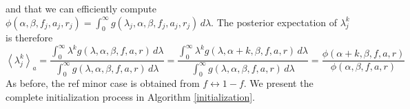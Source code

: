 \documentclass[nofootinbib,amssymb,amsmath]{revtex4}
\newcommand{\ave}[1]{\left\langle #1 \right\rangle}
\begin{document}
%
and that we can efficiently compute $\phi(\alpha, \beta, f_j, a_j, r_j) = \int_0^\infty g(\lambda_j, \alpha, \beta, f_j, a_j, r_j) \, d \lambda$.  The posterior expectation of $\lambda^k_j$ is therefore
%
\begin{equation}
\ave{\lambda^k_j}_a = \frac{\int_0^\infty \lambda^k g(\lambda, \alpha, \beta, f, a, r) \, d \lambda}{ \int_0^\infty g(\lambda, \alpha, \beta, f, a, r) \, d \lambda}
= \frac{\int_0^\infty \lambda^k g(\lambda, \alpha + k, \beta, f, a, r) \, d \lambda}{ \int_0^\infty g(\lambda, \alpha, \beta, f, a, r) \, d \lambda}
= \frac{ \phi(\alpha + k, \beta, f, a, r) }{ \phi(\alpha, \beta, f, a, r) }
\end{equation}
%
As before, the ref minor case is obtained from $f \leftrightarrow 1 - f$.  We present the complete initialization process in Algorithm \ref{initialization}.
\end{document}
